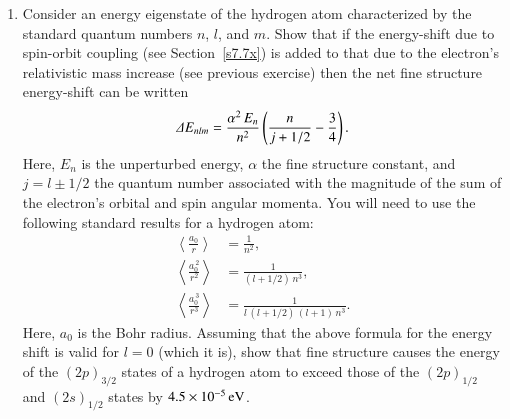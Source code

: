 \begin{enumerate}[label=\thechapter.\arabic*,leftmargin=*,widest=9.20]
\item Consider an energy eigenstate of the hydrogen atom characterized by the standard quantum numbers $n$, $l$, and $m$. 
Show that if the energy-shift due to spin-orbit coupling (see Section~\ref{s7.7x}) is added to that due to the electron's relativistic mass increase (see previous exercise) then the
net fine structure energy-shift can be written\label{ex7.2}
$$
{\mit\Delta} E_{nlm} = \frac{\alpha^2\,E_n}{n^2}\left(\frac{n}{j+1/2}-\frac{3}{4}\right).
$$
Here,  $E_n$ is the unperturbed energy,  $\alpha$ the fine structure constant, and $j=l\pm 1/2$ the quantum number associated
with the magnitude of the sum of the electron's orbital and spin angular momenta.  You will need to use the following standard results for a hydrogen atom:
\begin{align}
\left\langle \frac{a_0}{r}\right\rangle &= \frac{1}{n^2},\nonumber\\[0.5ex]
\left\langle \frac{a_0^{\,2}}{r^2}\right\rangle &= \frac{1}{(l+1/2)\,n^3},\nonumber\\[0.5ex]
\left\langle \frac{a_0^{\,3}}{r^3}\right\rangle &= \frac{1}{l\,(l+1/2)\,(l+1)\,n^3}.\nonumber
\end{align}
Here, $a_0$ is the Bohr radius. 
Assuming that the above formula for the energy shift is valid for $l=0$ (which it is), show that fine structure causes the
energy of the $(2p)_{3/2}$ states of a hydrogen atom to exceed those of the $(2p)_{1/2}$ and $(2s)_{1/2}$ states by
$4.5\times 10^{-5}\,{\rm eV}$. 
\end{enumerate}


